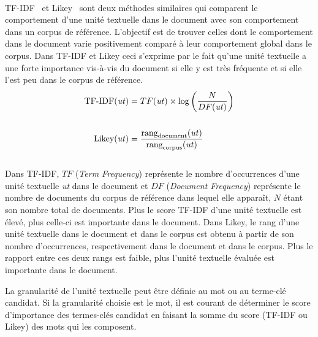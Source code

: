         ~\\TF-IDF~\cite{jones1972tfidf} et Likey~\cite{paukkeri2010likey}
        sont deux méthodes similaires qui comparent le comportement d'une unité
        textuelle dans le document avec son comportement dans un corpus de
        référence. L'objectif est de trouver celles dont le
        comportement dans le document varie positivement comparé à leur
        comportement global dans le corpus. Dans TF-IDF et Likey ceci
        s'exprime par le fait qu'une unité textuelle a une forte importance
        vis-à-vis du document si elle y est très fréquente et si elle l'est
        peu dans le corpus de référence.
        \begin{align}
          \text{TF-IDF}(\text{\textit{ut}}) &= TF(\text{\textit{ut}}) \times \log\left(\frac{N}{DF(\text{\textit{ut}})}\right) \label{math:tfidf}\\
          \notag\\
          \text{Likey}(\text{\textit{ut}}) &= \frac{\text{rang}_{\text{document}}(\text{\textit{ut}})}{\text{rang}_{\text{corpus}}(\text{\textit{ut}})} \label{math:likey}
        \end{align}\\
        Dans TF-IDF, $TF$ (\textit{Term Frequency}) représente le nombre
        d'occurrences d'une unité textuelle \textit{ut} dans le document et $DF$
        (\textit{Document Frequency}) représente le nombre de documents du
        corpus de référence dans lequel elle apparaît, $N$ étant son nombre
        total de documents. Plus le score TF-IDF d'une unité textuelle est
        élevé, plus celle-ci est importante dans le document. Dans Likey, le
        rang d'une unité textuelle dans le document et dans le corpus est obtenu
        à partir de son nombre d'occurrences, respectivement dans le document et
        dans le corpus. Plus le rapport entre ces deux rangs est faible, plus
        l'unité textuelle évaluée est importante dans le document.

        La granularité de l'unité textuelle peut être définie au mot ou au
        terme-clé candidat. Si la granularité choisie est le mot, il est
        courant de déterminer le score d'importance des termes-clés candidat en
        faisant la somme du score (TF-IDF ou Likey) des mots qui les composent.

